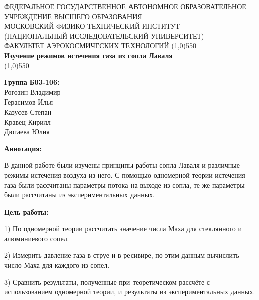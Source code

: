 \documentclass[a4paper,12pt]{article}
\begin{document}
\begin{titlepage}
\begin{center}
\large{\small ФЕДЕРАЛЬНОЕ ГОСУДАРСТВЕННОЕ АВТОНОМНОЕ ОБРАЗОВАТЕЛЬНОЕ\\ УЧРЕЖДЕНИЕ ВЫСШЕГО ОБРАЗОВАНИЯ \\ МОСКОВСКИЙ ФИЗИКО-ТЕХНИЧЕСКИЙ ИНСТИТУТ\\ (НАЦИОНАЛЬНЫЙ ИССЛЕДОВАТЕЛЬСКИЙ УНИВЕРСИТЕТ)\\ ФАКУЛЬТЕТ АЭРОКОСМИЧЕСКИХ ТЕХНОЛОГИЙ}
\vfill
\line(1,0){550}\\[1mm]
\huge\textbf{Изучение режимов истечения газа из сопла Лаваля}\\
\line(1,0){550}\\[1mm]
\vfill
\begin{flushright}
\normalsize{\textbf{Группа Б03-106:}} \\
\normalsize{Рогозин Владимир \\
            Герасимов Илья \\
            Казусев Степан \\ 
            Кравец Кирилл \\
            Дюгаева Юлия}\\
\end{flushright}
\end{center}
\end{titlepage}

\textbf{Аннотация:}

В данной работе были изучены принципы работы сопла Лаваля и различные режимы истечения воздуха из него. С помощью одномерной теории истечения газа были рассчитаны параметры потока на выходе из сопла, те же параметры были рассчитаны из экспериментальных данных.

\textbf{Цель работы:} 

1) По одномерной теории рассчитать значение числа Маха для стеклянного и алюминиевого сопел. 

2) Измерить давление газа в струе и в ресивире, по этим данным вычислить число Маха для каждого из сопел.

3) Сравнить результаты, полученные при теоретическом рассчёте с использованием одномерной теории, и результаты из экспериментальных данных.
\end{document}
